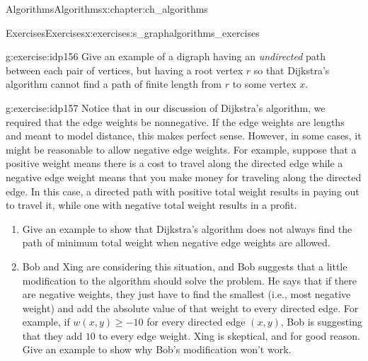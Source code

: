 \documentclass[oneside,10pt,]{book}
\numberwithin{equation}{section}
\begin{document}
\begin{chapterptx}{Algorithms}{}{Algorithms}{}{}{x:chapter:ch_algorithms}
\begin{exercises-section}{Exercises}{}{Exercises}{}{}{x:exercises:s_graphalgorithms_exercises}
\begin{divisionexercise}{15}{}{}{g:exercise:idp156}
Give an example of a digraph having an \emph{undirected} path between each pair of vertices, but having a root vertex \(r\) so that Dijkstra's algorithm cannot find a path of finite length from \(r\) to some vertex \(x\).%
\end{divisionexercise}%
\begin{divisionexercise}{16}{}{}{g:exercise:idp157}%
Notice that in our discussion of Dijkstra's algorithm, we required that the edge weights be nonnegative. If the edge weights are lengths and meant to model distance, this makes perfect sense. However, in some cases, it might be reasonable to allow negative edge weights. For example, suppose that a positive weight means there is a cost to travel along the directed edge while a negative edge weight means that you make money for traveling along the directed edge. In this case, a directed path with positive total weight results in paying out to travel it, while one with negative total weight results in a profit.%
\begin{enumerate}[label=(\alph*)]
\item{}Give an example to show that Dijkstra's algorithm does not always find the path of minimum total weight when negative edge weights are allowed.%
\item{}Bob and Xing are considering this situation, and Bob suggests that a little modification to the algorithm should solve the problem. He says that if there are negative weights, they just have to find the smallest (i.e.\@, most negative weight) and add the absolute value of that weight to every directed edge. For example, if \(w(x,y)\geq -10\) for every directed edge \((x,y)\), Bob is suggesting that they add \(10\) to every edge weight. Xing is skeptical, and for good reason. Give an example to show why Bob's modification won't work.%
\end{enumerate}
%
\end{divisionexercise}%
\end{exercises-section}
\end{chapterptx}
%
%
\typeout{************************************************}
\typeout{************************************************}
%
\end{document}
